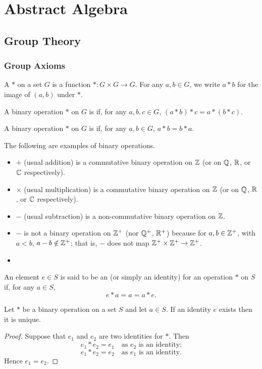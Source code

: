 \part{Abstract Algebra}
\chapter{Group Theory}
\section{Group Axioms}
\begin{definition}
A  $\ast$ on a set $G$ is a function $\ast:G\times G\to G$. For any $a,b\in G$, we write $a \ast b$ for the image of $(a,b)$ under $\ast$.

A binary operation $\ast$ on $G$ is  if, for any $a,b,c\in G$, $(a \ast b) \ast c = a \ast (b \ast c)$.

A binary operation $\ast$ on $G$ is  if, for any $a, b \in G$, $a \ast b = b \ast a$.
\end{definition}

\begin{example}
The following are examples of binary operations.
\begin{itemize}
\item $+$ (usual addition) is a commutative binary operation on $\mathbb Z$ (or on $\mathbb Q$, $\mathbb R$, or $\mathbb C$ respectively).
\item $\times$ (usual multiplication) is a commutative binary operation on $\mathbb Z$ (or on $\mathbb Q$, $\mathbb R$, or $\mathbb C$ respectively).
\item $-$ (usual subtraction) is a non-commutative binary operation on $\mathbb Z$.
\item $-$ is not a binary operation on $\mathbb Z^+$ (nor $\mathbb Q^+$, $\mathbb R^+$) because for $a,b\in\mathbb Z^+$, with $a<b$, $a-b\notin\mathbb Z^+$; that is, $-$ does not map $\mathbb Z^+\times\mathbb Z^+\to\mathbb Z^+$.
\item 
\end{itemize}
\end{example}

An element $e \in S$ is said to be an  (or simply an identity) for an operation $\ast$ on $S$ if, for any $a \in S$,
\[ e \ast a = a = a \ast e. \]

\begin{proposition}
Let $\ast$ be a binary operation on a set $S$ and let $a \in S$. If an identity $e$ exists then it is unique.
\end{proposition}
\begin{proof}
Suppose that $e_1$ and $e_2$ are two identities for $\ast$. Then
\[ e_1 \ast e_2 = e_1 \quad \text{as }e_2\text{ is an identity;} \]
\[ e_1 \ast e_2 = e_2 \quad \text{as }e_1\text{ is an identity.} \]
Hence $e_1 = e_2$.
\end{proof}

